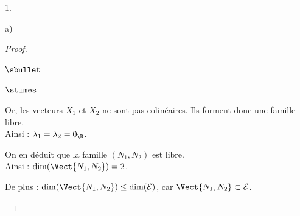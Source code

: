 \documentclass[11pt]{article}%
\begin{document}
\begin{noliste}{1.}
\begin{noliste}{a)}
\begin{proof}
\begin{noliste}{$\sbullet$}
\begin{noliste}{$\stimes$}
            \item Or, les vecteurs $X_1$ et $X_2$ ne sont pas
              colinéaires. Ils forment donc une famille libre.\\
              Ainsi : $\lambda_1=\lambda_2=0_{\R}$.
	  \end{noliste}
	  On en déduit que la famille $(N_1,N_2)$ est libre.\\
	  Ainsi : $\dim(\Vect{N_1,N_2}) = 2$.
	  
	  \item De plus : $\dim(\Vect{N_1,N_2}) \leq \dim({\cal E})$, 
	  car $\Vect{N_1,N_2} \subset {\cal E}$.
	  ~\\[-1.4cm]
      \end{noliste}
    \end{proof}

  \end{noliste}
\end{noliste}
\end{document}
